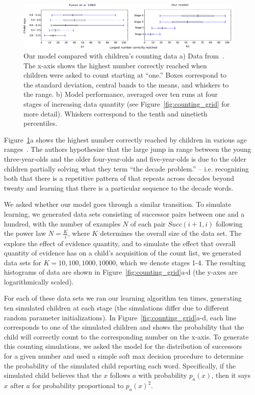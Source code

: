 \documentclass[10pt,letterpaper]{article}
\begin{document}
\begin{figure}[t]
\includegraphics[width=0.7\linewidth]{figures/modelboxplot}
\caption{Our model compared with children's counting data a) Data
  from~\citet{FusRicBriar1982}. The x-axis shows the highest number
  correctly reached when children were asked to count starting at
  ``one.'' Boxes correspond to the standard deviation, central bands
  to the means, and whiskers to the range. b) Model performance,
  averaged over ten runs at four stages of increasing data quantity
  (see Figure~\ref{fig:counting_grid} for more detail). Whiskers
  correspond to the tenth and ninetieth percentiles.
\label{fig:fuson_model_comparison}}
\end{figure}

Figure~\ref{fig:fuson_model_comparison}a shows the highest number
correctly reached by children in various age
ranges~\cite{FusRicBriar1982}. The authors hypothesize that the large
jump in range between the young three-year-olds and the older
four-year-olds and five-year-olds is due to the older children
partially solving what they term ``the decade problem.'' -- i.e.
recognizing both that there is a repetitive pattern of that repeats
across decades beyond twenty and learning that there is a particular
sequence to the decade words.

We asked whether our model goes through a similar transition. To
simulate learning, we generated data sets consisting of successor
pairs between one and a hundred, with the number of examples $N$ of each
pair $Succ(i+1, i)$ following the power law $N=\frac{K}{i}$, where $K$
determines the overall size of the data set. The explore the effect of
evidence quantity, and to simulate the effect that overall quantity
of evidence has on a child's acquisition of the count list, we
generated data sets for $K=10, 100, 1000, 10000$, which we denote
stages 1-4. The resulting histograms of data are shown in
Figure~\ref{fig:counting_grid}a-d (the y-axes are logarithmically
scaled).

For each of these data sets we ran our learning algorithm ten times,
generating ten simulated children at each stage (the simulations
differ due to different random parameter initializations). In
Figure~\ref{fig:counting_grid}a-d, each line corresponds to one of the
simulated children and shows the probability that the child will
correctly count to the corresponding number on the x-axis. To generate
this counting simulations, we asked the model for the distribution of
successors for a given number and used a simple soft max decision
procedure to determine the probability of the simulated child
reporting each word. Specifically, if the simulated child believes
that the $x$ follows $a$ with probability $p_a(x)$, then it says $x$
after $a$ for probability proportional to $p_a(x)^2 $.
\end{document}
